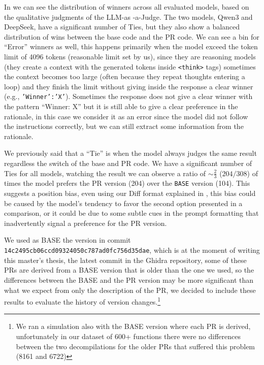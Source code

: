In  we can see the distribution of winners across all evaluated models, based on the qualitative judgments of the LLM-as -a-Judge.
The two models, Qwen3 and DeepSeek, have a significant number of Ties, but they also show a balanced distribution of wins between the base code and the \ac{PR} code.
We can see a bin for ``Error'' winners as well, this happens primarily when the model exceed the token limit of 4096 tokens (reasonable limit set by us), since they are reasoning models (they create a context with the generated tokens inside \texttt{<think>} tags) sometimes the context becomes too large (often because they repeat thoughts entering a loop) and they finish the limit without giving inside the response a clear winner (e.g., \texttt{'Winner':'X'}).
Sometimes the response does not give a clear winner with the pattern ``Winner: X'' but it is still able to give a clear preference in the rationale, in this case we consider it as an error since the model did not follow the instructions correctly, but we can still extract some information from the rationale.

We previously said that a ``Tie'' is when the model always judges the same result regardless the switch of the base and \ac{PR} code.
We have a significant number of Ties for all models, watching the result we can observe a ratio of $\sim \frac{2}{3}$ ($204 / 308$) of times the model prefers the \ac{PR} version (204) over the \texttt{BASE} version (104).
This suggests a position bias, even using our Diff format explained in , this bias could be caused by the model's tendency to favor the second option presented in a comparison, or it could be due to some subtle cues in the prompt formatting that inadvertently signal a preference for the \ac{PR} version. 

We used as BASE the version in commit \texttt{14c2495cb06ccd09324050c787ad0fc756d35dae}, which is at the moment of writing this master's thesis, the latest commit in the Ghidra repository, some of these \acp{PR} are derived from a BASE version that is older than the one we used, so the differences between the BASE and the PR version may be more significant than what we expect from only the description of the \ac{PR}, 
we decided to include these results to evaluate the history of version changes.\footnote{We ran a simulation also with the BASE version where each \ac{PR} is derived, unfortunately in our dataset of 600+ functions there were no differences between the two decompilations for the older \acp{PR} that suffered this problem (8161 and 6722)}

